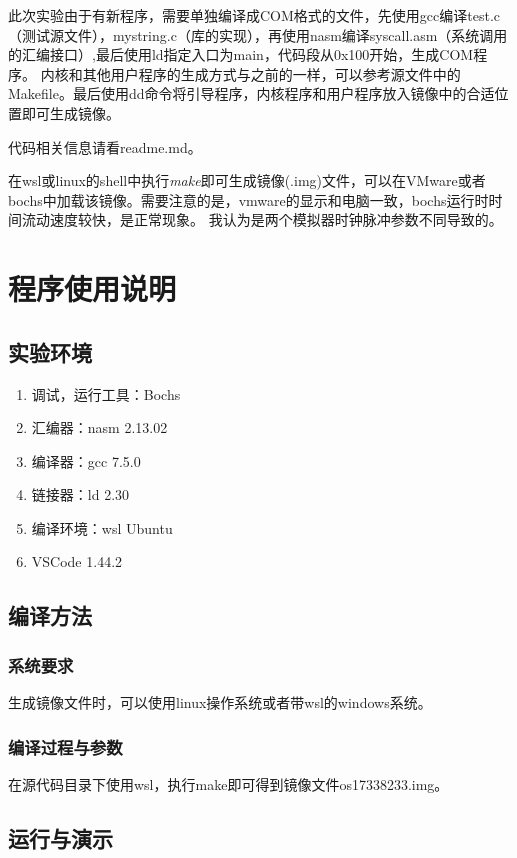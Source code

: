 \documentclass[a4paper, 11pt]{article} %
\begin{document}
此次实验由于有新程序，需要单独编译成COM格式的文件，先使用gcc编译test.c（测试源文件），mystring.c（库的实现），再使用nasm编译syscall.asm（系统调用的汇编接口）,最后使用ld指定入口为main，代码段从0x100开始，生成COM程序。
内核和其他用户程序的生成方式与之前的一样，可以参考源文件中的Makefile。最后使用dd命令将引导程序，内核程序和用户程序放入镜像中的合适位置即可生成镜像。

代码相关信息请看readme.md。

在wsl或linux的shell中执行\textit{make}即可生成镜像(.img)文件，可以在VMware或者bochs中加载该镜像。需要注意的是，vmware的显示和电脑一致，bochs运行时时间流动速度较快，是正常现象。
我认为是两个模拟器时钟脉冲参数不同导致的。

\section{程序使用说明}
\subsection{实验环境}
\begin{enumerate}
  \item 调试，运行工具：Bochs
  \item 汇编器：nasm 2.13.02
  \item 编译器：gcc 7.5.0
  \item 链接器：ld 2.30
  \item 编译环境：wsl Ubuntu
  \item VSCode 1.44.2
\end{enumerate}

\subsection{编译方法}

\subsubsection{系统要求}

生成镜像文件时，可以使用linux操作系统或者带wsl的windows系统。

\subsubsection{编译过程与参数}

在源代码目录下使用wsl，执行make即可得到镜像文件os17338233.img。

\subsection{运行与演示}
\end{document}
